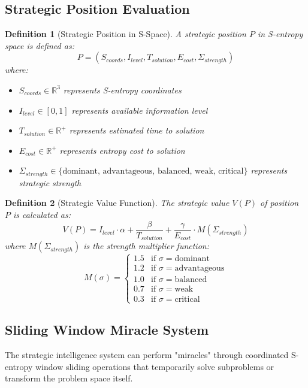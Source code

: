 \documentclass[12pt,a4paper]{article}
\newtheorem{definition}{Definition}
\begin{document}
\subsection{Strategic Position Evaluation}

\begin{definition}[Strategic Position in S-Space]
A strategic position $P$ in S-entropy space is defined as:
$$P = (S_{coords}, I_{level}, T_{solution}, E_{cost}, \Sigma_{strength})$$
where:
\begin{itemize}
\item $S_{coords} \in \mathbb{R}^3$ represents S-entropy coordinates
\item $I_{level} \in [0,1]$ represents available information level
\item $T_{solution} \in \mathbb{R}^+$ represents estimated time to solution
\item $E_{cost} \in \mathbb{R}^+$ represents entropy cost to solution  
\item $\Sigma_{strength} \in \{\text{dominant, advantageous, balanced, weak, critical}\}$ represents strategic strength
\end{itemize}
\end{definition}

\begin{definition}[Strategic Value Function]
The strategic value $V(P)$ of position $P$ is calculated as:
$$V(P) = I_{level} \cdot \alpha + \frac{\beta}{T_{solution}} + \frac{\gamma}{E_{cost}} \cdot M(\Sigma_{strength})$$
where $M(\Sigma_{strength})$ is the strength multiplier function:
$$M(\sigma) = \begin{cases}
1.5 & \text{if } \sigma = \text{dominant} \\
1.2 & \text{if } \sigma = \text{advantageous} \\
1.0 & \text{if } \sigma = \text{balanced} \\
0.7 & \text{if } \sigma = \text{weak} \\
0.3 & \text{if } \sigma = \text{critical}
\end{cases}$$
\end{definition}

\subsection{Sliding Window Miracle System}

The strategic intelligence system can perform "miracles" through coordinated S-entropy window sliding operations that temporarily solve subproblems or transform the problem space itself.
\end{document}
